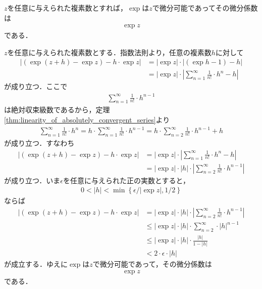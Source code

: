 	\begin{screen}
		\begin{thm}[指数関数は各点で微分可能]
			$z$を任意に与えられた複素数とすれば，$\exp$は$z$で微分可能であってその微分係数は
			\begin{align}
				\exp{z}
			\end{align}
			である．
		\end{thm}
	\end{screen}
	
	\begin{sketch}
		$z$を任意に与えられた複素数とする．指数法則より，任意の複素数$h$に対して
		\begin{align}
			|(\exp{(z+h)} - \exp{z}) - h \cdot \exp{z}|
			&= |\exp{z}| \cdot |(\exp{h} - 1) - h| \\
			&= |\exp{z}| \cdot \left|\sum_{n=1}^\infty \frac{1}{n!} \cdot h^n - h\right|
		\end{align}
		が成り立つ．ここで
		\begin{align}
			\sum_{n=1}^\infty \frac{1}{n!} \cdot h^{n-1}
		\end{align}
		は絶対収束級数であるから，定理\ref{thm:linearity_of_absolutely_convergent_series}より
		\begin{align}
			\sum_{n=1}^\infty \frac{1}{n!} \cdot h^{n}
			= h \cdot \sum_{n=1}^\infty \frac{1}{n!} \cdot h^{n-1}
			= h \cdot \sum_{n=2}^\infty \frac{1}{n!} \cdot h^{n-1} + h
		\end{align}
		が成り立つ．すなわち
		\begin{align}
			|(\exp{(z+h)} - \exp{z}) - h \cdot \exp{z}|
			&= |\exp{z}| \cdot \left|\sum_{n=1}^\infty \frac{1}{n!} \cdot h^n - h\right| \\
			&= |\exp{z}| \cdot |h| \cdot \left|\sum_{n=2}^\infty \frac{1}{n!} \cdot h^{n-1}\right|
		\end{align}
		が成り立つ．いま$\epsilon$を任意に与えられた正の実数とすると，
		\begin{align}
			0 < |h| < \min\left\{\epsilon/|\exp{z}|,1/2\right\}
		\end{align}
		ならば
		\begin{align}
			|(\exp{(z+h)} - \exp{z}) - h \cdot \exp{z}|
			&= |\exp{z}| \cdot |h| \cdot \left|\sum_{n=2}^\infty \frac{1}{n!} \cdot h^{n-1}\right| \\
			&\leq |\exp{z}| \cdot |h| \cdot \sum_{n=2}^\infty \cdot |h|^{n-1} \\
			&\leq |\exp{z}| \cdot |h| \cdot \frac{|h|}{1-|h|} \\
			&< 2 \cdot \epsilon \cdot |h|
		\end{align}
		が成立する．ゆえに$\exp$は$z$で微分可能であって，その微分係数は
		\begin{align}
			\exp{z}
		\end{align}
		である．
		\QED
	\end{sketch}
	
